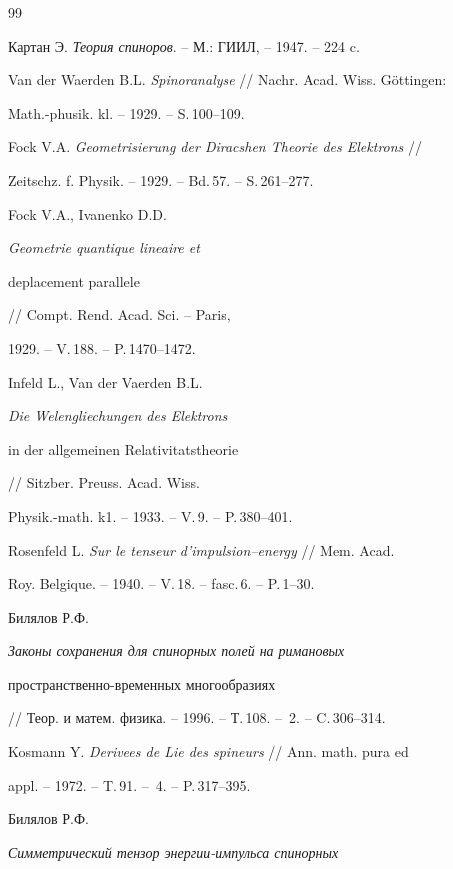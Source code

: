 \begin{thebibliography}{99}







Картан Э. {\em Теория спиноров}. -- М.: ГИИЛ, -- 1947. -- 224 c.




Van der Waerden B.L. {\em Spinoranalyse} // Nachr. Acad. Wiss. G\"ottingen:


Math.-phusik. kl. -- 1929. -- S.\,100--109.




Fock V.A. {\em Geometrisierung der Diracshen Theorie des Elektrons} //


Zeitschz. f. Physik. -- 1929. -- Bd.\,57. -- S.\,261--277.




Fock V.A., Ivanenko D.D. {\em Geometrie quantique lineaire et


deplacement parallele} // Compt. Rend. Acad. Sci. -- Paris,


1929. -- V.\,188. -- P.\,1470--1472.




Infeld L., Van der Vaerden B.L. {\em Die Welengliechungen des Elektrons


in der allgemeinen Relativitatstheorie}


// Sitzber. Preuss. Acad. Wiss.


Physik.-math. k1. -- 1933. -- V.\,9. -- P.\,380--401.




Rosenfeld L. {\em Sur le tenseur d'impulsion--energy} // Mem. Acad.


Roy. Belgique. -- 1940. -- V.\,18. -- fasc.\,6. -- P.\,1--30.




Билялов Р.Ф. {\em Законы сохранения для спинорных полей на римановых


пространственно-временных многообразиях}


// Теор. и матем. физика. -- 1996. -- Т.\,108. -- \No\,2. -- C.\,306--314.




Kosmann Y. {\em Derivees de Lie des spineurs} // Ann. math. pura ed


appl. -- 1972. -- T.\,91. -- \No\,4. -- P.\,317--395.




Билялов Р.Ф. {\em Симметрический тензор энергии-импульса спинорных


}
\end{thebibliography}
